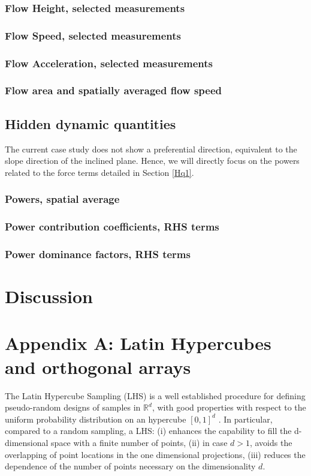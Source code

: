 \documentclass{article}
\begin{document}
\subsubsection{Flow Height, selected measurements}

\subsubsection{Flow Speed, selected measurements}

\subsubsection{Flow Acceleration, selected measurements}

\subsubsection{Flow area and spatially averaged flow speed}

\subsection{Hidden dynamic quantities}\label{Hq2}
The current case study does not show a preferential direction, equivalent to the slope direction of the inclined plane. Hence, we will directly focus on the powers related to the force terms detailed in Section \ref{Hq1}.

\subsubsection{Powers, spatial average}

\subsubsection{Power contribution coefficients, RHS terms}

\subsubsection{Power dominance factors, RHS terms}\label{stat2}

\section{Discussion}

\section*{Appendix A: Latin Hypercubes and orthogonal arrays}\label{Appendix}
The Latin Hypercube Sampling (LHS) is a well established procedure for defining pseudo-random designs of samples in $\mathbb R^d$, with good properties with respect to the uniform probability distribution on an hypercube $[0,1]^d$ \citep{McKay1979,Owen1992b,Stein1987,Ranjan2014,Mingyao2016}. In particular, compared to a random sampling, a LHS: (i) enhances the capability to fill the d-dimensional space with a finite number of points, (ii) in case $d>1$, avoids the overlapping of point locations in the one dimensional projections, (iii) reduces the dependence of the number of points necessary on the dimensionality $d$.
\end{document}
